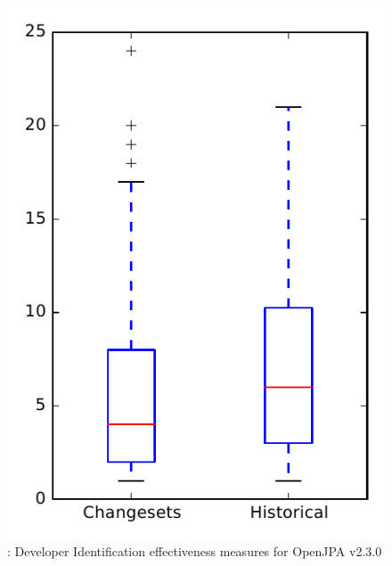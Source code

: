 
\begin{figure}
\centering
\includegraphics[height=0.4\textheight]{figures/dit/rq2_openjpa}
\caption{\dtwo: Developer Identification effectiveness measures for OpenJPA v2.3.0}
\label{fig:dit:rq2:openjpa}
\end{figure}

